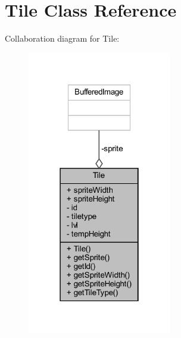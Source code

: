 \hypertarget{classobjects_1_1_tile}{}\section{Tile Class Reference}
\label{classobjects_1_1_tile}


Collaboration diagram for Tile\+:\nopagebreak
\begin{figure}[H]
\begin{center}
\leavevmode
\includegraphics[width=178pt]{classobjects_1_1_tile__coll__graph}
\end{center}
\end{figure}
